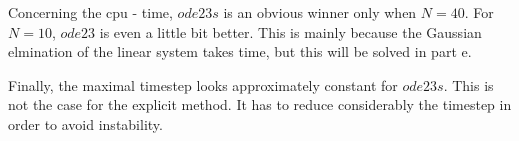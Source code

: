 Concerning the cpu - time, $ode23s$ is an obvious winner only when $N=40$. For $N=10$, $ode23$ is even a little bit better. This is mainly because the Gaussian elmination of the linear system takes time, but this will be solved in part e.

Finally, the maximal timestep looks approximately constant for $ode23s$. This is not the case for the explicit method. It has to reduce considerably the timestep in order to avoid instability.
